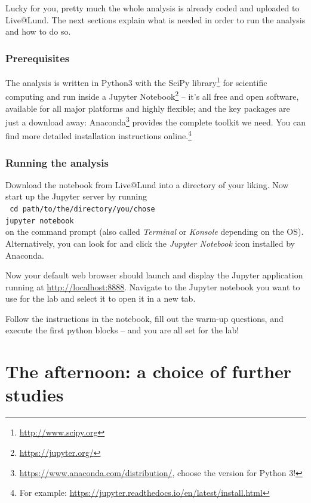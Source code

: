 \documentclass[a4,11pt, notitlepage]{article}
\begin{document}
Lucky for you, pretty much the whole analysis is already coded and
uploaded to Live@Lund. The next
sections explain what is needed in order to run the analysis and how
to do so.

\subsubsection{Prerequisites}
\label{sec:prerequisites}

The analysis is written in Python3 with the SciPy
library\footnote{\url{http://www.scipy.org}} for scientific computing and run
inside a Jupyter Notebook\footnote{\url{https://jupyter.org/}} -- it's all
  free and open software, available for all major platforms and
  highly flexible; and the key packages are just a download away:
  Anaconda\footnote{\url{https://www.anaconda.com/distribution/}, choose the version
    for Python 3!} provides the complete toolkit we need.
  You can find more detailed installation instructions online.\footnote{For
  example: \url{https://jupyter.readthedocs.io/en/latest/install.html}}

\subsubsection{Running the analysis}
\label{sec:running-analysis}

Download the notebook from Live@Lund into a directory
of your liking. Now start up the Jupyter server by running\\
\texttt{\hphantom{35mm} cd path/to/the/directory/you/chose\\
\hphantom{35mm} jupyter notebook} \\
on the command prompt (also called \emph{Terminal} or \emph{Konsole}
depending on the OS). Alternatively, you can look for and click the \emph{Jupyter Notebook}
icon installed by Anaconda.

Now your default web browser should launch and display the Jupyter application
running at \url{http://localhost:8888}. Navigate to the Jupyter notebook you
want to use for the lab and select it to open it in a new tab.

Follow the instructions in the notebook, fill out the warm-up questions, and
execute the first python blocks -- and you are all set for the lab!


\section{The afternoon: a choice of further studies}
\label{sec:afternoon}
\end{document}
